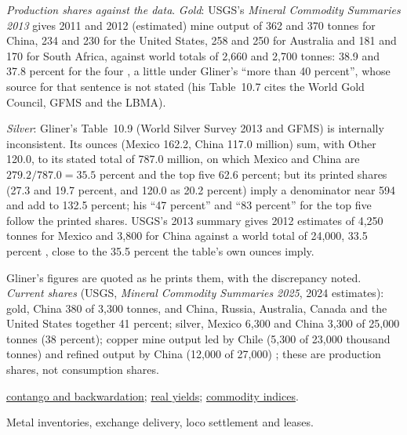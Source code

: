 \begin{qfdefinition}
\emph{Production shares against the data}. \emph{Gold}: USGS's \emph{Mineral Commodity Summaries 2013} gives 2011 and 2012 (estimated) mine output of 362 and 370 tonnes for China, 234 and 230 for the United States, 258 and 250 for Australia and 181 and 170 for South Africa, against world totals of 2,660 and 2,700 tonnes: 38.9 and 37.8 percent for the four \citep[gold, p.~2]{usgs-mcs-2013}, a little under Gliner's ``more than 40 percent'', whose source for that sentence is not stated (his Table~10.7 cites the World Gold Council, GFMS and the LBMA).

\emph{Silver}: Gliner's Table~10.9 (World Silver Survey 2013 and GFMS) is internally inconsistent. Its ounces (Mexico 162.2, China 117.0 million) sum, with Other 120.0, to its stated total of 787.0 million, on which Mexico and China are $279.2/787.0=35.5$ percent and the top five 62.6 percent; but its printed shares (27.3 and 19.7 percent, and 120.0 as 20.2 percent) imply a denominator near 594 and add to 132.5 percent; his ``47 percent'' and ``83 percent'' for the top five follow the printed shares. USGS's 2013 summary gives 2012 estimates of 4,250 tonnes for Mexico and 3,800 for China against a world total of 24,000, 33.5 percent \citep[silver, p.~2]{usgs-mcs-2013}, close to the 35.5 percent the table's own ounces imply.

Gliner's figures are quoted as he prints them, with the discrepancy noted. \emph{Current shares} (USGS, \emph{Mineral Commodity Summaries 2025}, 2024 estimates): gold, China 380 of 3,300 tonnes, and China, Russia, Australia, Canada and the United States together 41 percent; silver, Mexico 6,300 and China 3,300 of 25,000 tonnes (38 percent); copper mine output led by Chile (5,300 of 23,000 thousand tonnes) and refined output by China (12,000 of 27,000) \citep[gold, silver and copper, pp.~1--2]{usgs-mcs-2025}; these are production shares, not consumption shares.

 \hyperref[def:contango-backwardation-stocks]{contango and backwardation}; \hyperref[def:tips-breakevens]{real yields}; \hyperref[def:commodity-indices-risk-return]{commodity indices}.

 Metal inventories, exchange delivery, loco settlement and leases.

\end{qfdefinition}
